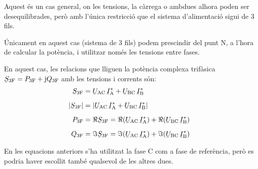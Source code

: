 Aquest és un cas  general, on les tensions, la càrrega o ambdues alhora  poden ser desequilibrades, però amb l'única restricció que
el sistema d'alimentació sigui de 3 fils.

 Únicament en aquest cas (sistema de 3 fils) podem prescindir del punt N, a l'hora de
calcular la potència, i utilitzar només les tensions entre fases.

En aquest cas, les relacions que lliguen la potència complexa
trifàsica $\cmplx{S}\ped{3F} = P\ped{3F} + \ju Q\ped{3F}$ amb les
tensions i corrents són:
\begin{align}
    \cmplx{S}\ped{3F} &= \cmplx{U}\ped{AC} \,\cmplx{I}\ped{A}^*
     +  \cmplx{U}\ped{BC} \,\cmplx{I}\ped{B}^*  \label{eq:s_3f_3fils}\\[2mm]
    |\cmplx{S}\ped{3F}| &= |\cmplx{U}\ped{AC}\, \cmplx{I}\ped{A}^* +
    \cmplx{U}\ped{BC}\, \cmplx{I}\ped{B}^*| \\[2mm]
    P\ped{3F} &= \Re\cmplx{S}\ped{3F}= \Re(\cmplx{U}\ped{AC}\, \cmplx{I}\ped{A}^*) +
    \Re(\cmplx{U}\ped{BC}\, \cmplx{I}\ped{B}^*) \\[2mm]
    Q\ped{3F} &= \Im\cmplx{S}\ped{3F}=\Im(\cmplx{U}\ped{AC} \,\cmplx{I}\ped{A}^*) +
    \Im(\cmplx{U}\ped{BC} \,\cmplx{I}\ped{B}^*)
\end{align}

En les equacions anteriors s'ha utilitzat la fase C com a
fase de referència, però es podria haver escollit també qualsevol de
les altres dues.


